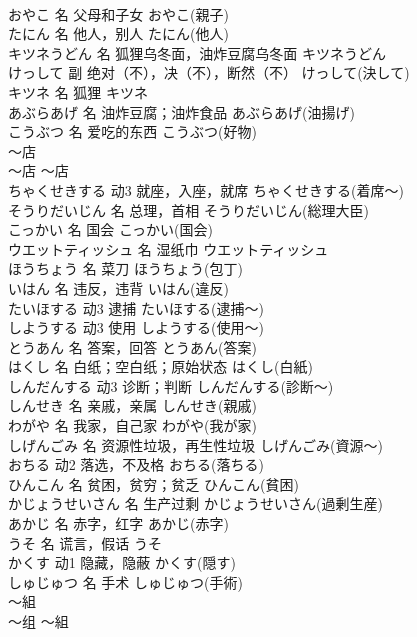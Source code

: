 \documentclass[8pt]{extreport}
\begin{document}
\begin{CJK}{UTF8}{min}
\\	おやこ	名	父母和子女	おやこ(親子)	
\\	たにん	名	他人，别人	たにん(他人)	
\\	キツネうどん	名	狐狸乌冬面，油炸豆腐乌冬面	キツネうどん	
\\	けっして	副	绝对（不），决（不），断然（不）	けっして(決して)	
\\	キツネ	名	狐狸	キツネ	
\\	あぶらあげ	名	油炸豆腐；油炸食品	あぶらあげ(油揚げ)	
\\	こうぶつ	名	爱吃的东西	こうぶつ(好物)	
\\	～店	
\\	～店	～店	
\\	ちゃくせきする	动3	就座，入座，就席	ちゃくせきする(着席～)	
\\	そうりだいじん	名	总理，首相	そうりだいじん(総理大臣)	
\\	こっかい	名	国会	こっかい(国会)	
\\	ウエットティッシュ	名	湿纸巾	ウエットティッシュ	
\\	ほうちょう	名	菜刀	ほうちょう(包丁)	
\\	いはん	名	违反，违背	いはん(違反)	
\\	たいほする	动3	逮捕	たいほする(逮捕～)	
\\	しようする	动3	使用	しようする(使用～)	
\\	とうあん	名	答案，回答	とうあん(答案)	
\\	はくし	名	白纸；空白纸；原始状态	はくし(白紙)	
\\	しんだんする	动3	诊断；判断	しんだんする(診断～)	
\\	しんせき	名	亲戚，亲属	しんせき(親戚)	
\\	わがや	名	我家，自己家	わがや(我が家)	
\\	しげんごみ	名	资源性垃圾，再生性垃圾	しげんごみ(資源～)	
\\	おちる	动2	落选，不及格	おちる(落ちる)	
\\	ひんこん	名	贫困，贫穷；贫乏	ひんこん(貧困)	
\\	かじょうせいさん	名	生产过剩	かじょうせいさん(過剰生産)	
\\	あかじ	名	赤字，红字	あかじ(赤字)	
\\	うそ	名	谎言，假话	うそ	
\\	かくす	动1	隐藏，隐蔽	かくす(隠す)	
\\	しゅじゅつ	名	手术	しゅじゅつ(手術)	
\\	～組	
\\	～组	～組	

\end{CJK}
\end{document}
